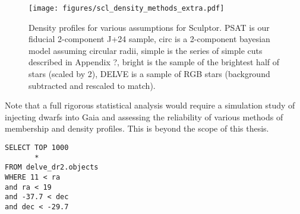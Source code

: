 \begin{figure}
\centering
\texttt{[image: figures/scl\_density\_methods\_extra.pdf]}
\caption[Density profiles]{Density profiles for various assumptions for
Sculptor. PSAT is our fiducial 2-component J+24 sample, circ is a
2-component bayesian model assuming circular radii, simple is the series
of simple cuts described in Appendix ?, bright is the sample of the
brightest half of stars (scaled by 2), DELVE is a sample of RGB stars
(background subtracted and rescaled to
match).}\label{fig:sculptor_observed_profiles}
\end{figure}

Note that a full rigorous statistical analysis would require a
simulation study of injecting dwarfs into Gaia and assessing the
reliability of various methods of membership and density profiles. This
is beyond the scope of this thesis.

\begin{verbatim}
SELECT TOP 1000
       *
FROM delve_dr2.objects
WHERE 11 < ra
and ra < 19
and -37.7 < dec
and dec < -29.7
\end{verbatim}
